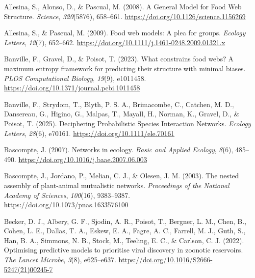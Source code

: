 \documentclass[
]{article}
\newlength{\cslhangindent}
\newenvironment{CSLReferences}[2] %
 {\begin{list}{}{%
  \setlength{\itemindent}{0pt}
  \setlength{\leftmargin}{0pt}
  \setlength{\parsep}{0pt}
  \ifodd #1
   \setlength{\leftmargin}{\cslhangindent}
   \setlength{\itemindent}{-1\cslhangindent}
  \fi
  \setlength{\itemsep}{#2\baselineskip}}}
 {\end{list}}
\begin{document}
\label{refs}
\begin{CSLReferences}{1}{0}
Allesina, S., Alonso, D., \& Pascual, M. (2008). A {General Model} for
{Food Web Structure}. \emph{Science}, \emph{320}(5876), 658--661.
\url{https://doi.org/10.1126/science.1156269}

Allesina, S., \& Pascual, M. (2009). Food web models: A plea for groups.
\emph{Ecology Letters}, \emph{12}(7), 652--662.
\url{https://doi.org/10.1111/j.1461-0248.2009.01321.x}

Banville, F., Gravel, D., \& Poisot, T. (2023). What constrains food
webs? {A} maximum entropy framework for predicting their structure with
minimal biases. \emph{PLOS Computational Biology}, \emph{19}(9),
e1011458. \url{https://doi.org/10.1371/journal.pcbi.1011458}

Banville, F., Strydom, T., Blyth, P. S. A., Brimacombe, C., Catchen, M.
D., Dansereau, G., Higino, G., Malpas, T., Mayall, H., Norman, K.,
Gravel, D., \& Poisot, T. (2025). Deciphering {Probabilistic Species
Interaction Networks}. \emph{Ecology Letters}, \emph{28}(6), e70161.
\url{https://doi.org/10.1111/ele.70161}

Bascompte, J. (2007). Networks in ecology. \emph{Basic and Applied
Ecology}, \emph{8}(6), 485--490.
\url{https://doi.org/10.1016/j.baae.2007.06.003}

Bascompte, J., Jordano, P., Melian, C. J., \& Olesen, J. M. (2003). The
nested assembly of plant-animal mutualistic networks. \emph{Proceedings
of the National Academy of Sciences}, \emph{100}(16), 9383--9387.
\url{https://doi.org/10.1073/pnas.1633576100}

Becker, D. J., Albery, G. F., Sjodin, A. R., Poisot, T., Bergner, L. M.,
Chen, B., Cohen, L. E., Dallas, T. A., Eskew, E. A., Fagre, A. C.,
Farrell, M. J., Guth, S., Han, B. A., Simmons, N. B., Stock, M.,
Teeling, E. C., \& Carlson, C. J. (2022). Optimising predictive models
to prioritise viral discovery in zoonotic reservoirs. \emph{The Lancet
Microbe}, \emph{3}(8), e625--e637.
\url{https://doi.org/10.1016/S2666-5247(21)00245-7}


\end{CSLReferences}
\end{document}
